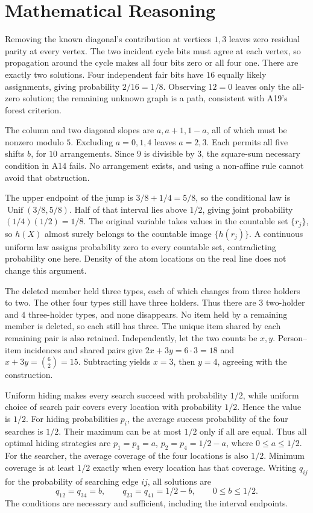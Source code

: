 \section{Mathematical Reasoning}

Removing the known diagonal's contribution at vertices $1,3$ leaves zero residual parity at every vertex. The two incident cycle bits must agree at each vertex, so propagation around the cycle makes all four bits zero or all four one. There are exactly two solutions. Four independent fair bits have $16$ equally likely assignments, giving probability $2/16=1/8$. Observing $12=0$ leaves only the all-zero solution; the remaining unknown graph is a path, consistent with A19's forest criterion.

The column and two diagonal slopes are $a,a+1,1-a$, all of which must be nonzero modulo $5$. Excluding $a=0,1,4$ leaves $a=2,3$. Each permits all five shifts $b$, for $10$ arrangements. Since $9$ is divisible by $3$, the square-sum necessary condition in A14 fails. No arrangement exists, and using a non-affine rule cannot avoid that obstruction.

The upper endpoint of the jump is $3/8+1/4=5/8$, so the conditional law is $\operatorname{Unif}(3/8,5/8)$. Half of that interval lies above $1/2$, giving joint probability $(1/4)(1/2)=1/8$.
The original variable takes values in the countable set $\{r_j\}$, so $h(X)$ almost surely belongs to the countable image $\{h(r_j)\}$. A continuous uniform law assigns probability zero to every countable set, contradicting probability one here. Density of the atom locations on the real line does not change this argument.

The deleted member held three types, each of which changes from three holders to two. The other four types still have three holders. Thus there are $3$ two-holder and $4$ three-holder types, and none disappears. No item held by a remaining member is deleted, so each still has three. The unique item shared by each remaining pair is also retained.
Independently, let the two counts be $x,y$. Person--item incidences and shared pairs give $2x+3y=6\cdot3=18$ and $x+3y=\binom62=15$. Subtracting yields $x=3$, then $y=4$, agreeing with the construction.

Uniform hiding makes every search succeed with probability $1/2$, while uniform choice of search pair covers every location with probability $1/2$. Hence the value is $1/2$.
For hiding probabilities $p_i$, the average success probability of the four searches is $1/2$. Their maximum can be at most $1/2$ only if all are equal. Thus all optimal hiding strategies are $p_1=p_3=a$, $p_2=p_4=1/2-a$, where $0\le a\le1/2$.
For the searcher, the average coverage of the four locations is also $1/2$. Minimum coverage is at least $1/2$ exactly when every location has that coverage. Writing $q_{ij}$ for the probability of searching edge $ij$, all solutions are
\[
 q_{12}=q_{34}=b,\qquad q_{23}=q_{41}=1/2-b,
 \qquad0\le b\le1/2.
\]
The conditions are necessary and sufficient, including the interval endpoints.

